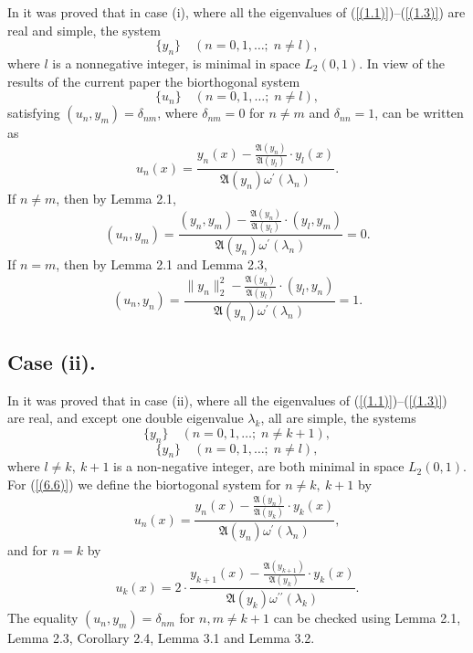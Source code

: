 \documentclass[pdflatex,sn-mathphys-num]{sn-jnl}%
\theoremstyle{thmstyleone}%
\theoremstyle{thmstyletwo}%
\theoremstyle{thmstylethree}%
\theoremstyle{definition}
\theoremstyle{remark}
\numberwithin{equation}{section}
\begin{document}
 In \cite{aliyev5} it was proved that in case (i), where  all the eigenvalues of (\ref{(1.1)})--(\ref{(1.3)}) are real and simple, the system
\begin{equation}
  \{ y_n \} \quad (n = 0,1,\ldots;\; n \neq l), \label{(6.1)} 
\end{equation}
where $l$ is a nonnegative integer, is minimal in space $L_2(0,1)$. In view of the results of the current paper the biorthogonal system
\begin{equation}
\{ u_n \} \quad (n = 0,1,\ldots;\; n \neq l), \label{(6.2)}
\end{equation}
satisfying $(u_n, y_m) = \delta_{nm}$, where $\delta_{nm}=0$ for $n \neq m$ and $\delta_{nn}=1$, can be written as 
\begin{equation}
u_n(x)=\frac{y_n(x)-\frac{\mathfrak{A}(y_{n})}{\mathfrak{A}(y_l)}\cdot y_l(x)}{ \mathfrak{A}(y_{n})\omega^\prime(\lambda_n)}
. \label{(6.3)}
\end{equation}
If $n\neq m$, then by Lemma 2.1,
\begin{equation}
(u_n, y_m)=\frac{(y_n,y_m)-\frac{\mathfrak{A}(y_{n})}{\mathfrak{A}(y_l)}\cdot (y_l, y_m)}{ \mathfrak{A}(y_{n})\omega^\prime(\lambda_n)}=0.
\label{(6.4)}
\end{equation}
If $n=m$, then by Lemma 2.1 and Lemma 2.3,
\begin{equation}
(u_n, y_n)=\frac{\|y_n\|_2^2-\frac{\mathfrak{A}(y_{n})}{\mathfrak{A}(y_l)}\cdot (y_l, y_n)}{ \mathfrak{A}(y_{n})\omega^\prime(\lambda_n)}=1.
\label{(6.5)}
\end{equation}

\subsection{Case (ii).}



In \cite{aliyev5} it was proved that in case (ii), where  all the eigenvalues of (\ref{(1.1)})--(\ref{(1.3)}) are real, and except one double eigenvalue $\lambda_k$, all are simple, the systems
\begin{equation}
  \{ y_n \} \quad (n = 0,1,\ldots;\; n \neq k+1), \label{(6.6)} 
\end{equation}
\begin{equation}
  \{ y_n \} \quad (n = 0,1,\ldots;\; n \neq l), \label{(6.12)} 
\end{equation}
where $l \ne k,\ k+1$ is a non-negative integer, are both minimal in space $L_2(0,1)$. For (\ref{(6.6)}) we define the biortogonal system for $n \ne k,\ k+1$ by
\begin{equation}
u_n(x)=\frac{y_n(x)-\frac{\mathfrak{A}(y_{n})}{\mathfrak{A}(y_k)}\cdot y_k(x)}{ \mathfrak{A}(y_{n})\omega^\prime(\lambda_n)}
, \label{(6.7)}
\end{equation}
and for $n = k$ by
\begin{equation}
u_k(x)=2\cdot\frac{y_{k+1}(x)-\frac{\mathfrak{A}(y_{k+1})}{\mathfrak{A}(y_k)}\cdot y_k(x)}{ \mathfrak{A}(y_k)\omega^{\prime\prime}(\lambda_k)}
. \label{(6.8)}
\end{equation}
The equality $(u_n, y_m) = \delta_{nm}$ for $ n,m\neq k+1$ can be checked using Lemma 2.1, Lemma 2.3, Corollary 2.4, Lemma 3.1 and Lemma 3.2.
\end{document}
